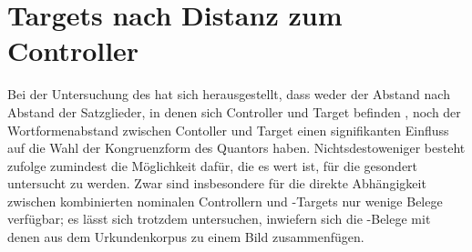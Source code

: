 
\section{Targets nach Distanz zum Controller}
\label{sec:kctargdist}

Bei der Untersuchung des \CAO{} hat sich herausgestellt, dass weder
der  Abstand nach Abstand der Satzglieder, in denen sich
Controller und Target befinden%
, noch der Wortformen\-abstand
zwischen Contoller und Target einen signifikanten Einfluss auf die Wahl der
Kongruenzform des Quantors haben. Nichtsdestoweniger besteht
\citet{corbett1979} zufolge zumindest die Möglichkeit dafür, die es wert ist,
für die \citet{kc} gesondert untersucht zu werden. Zwar sind insbesondere
für die direkte Abhängigkeit zwischen kombinierten nominalen Controllern und
-Targets nur wenige Belege verfügbar; es lässt sich trotzdem
unter\-suchen, inwiefern sich die \citet{kc}-Belege mit denen aus dem
Urkundenkorpus zu einem Bild zusammenfügen.




